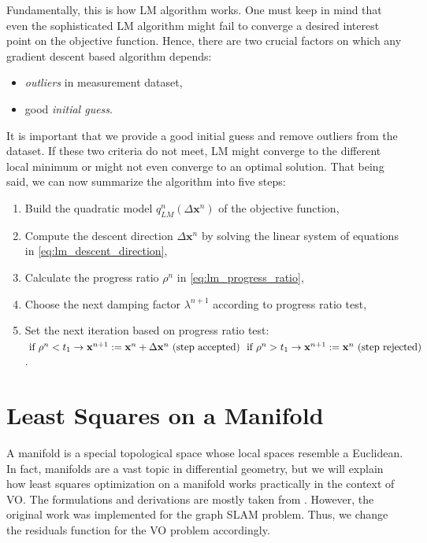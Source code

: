 \documentclass[a4paper]{report}
\numberwithin{figure}{section}
\begin{document}
\begin{appendices}
Fundamentally, this is how LM algorithm works. 
One must keep in mind that even the sophisticated LM algorithm might fail to 
converge a desired interest point on the objective function. Hence, 
there are two crucial factors on which any gradient descent based algorithm depends:
\begin{itemize}
  \item \textit{outliers} in measurement dataset,
  \item good \textit{initial guess}. 
\end{itemize}

It is important that we provide a good initial
guess and remove outliers from the dataset. 
If these two criteria do not meet, LM might converge to the
different local minimum or might not even converge to
an optimal solution. 
That being said, we can now summarize the algorithm into five steps:

\begin{enumerate}
  \item Build the quadratic model $q_{LM}^n(\Delta \mathbf{x}^n)$ of the objective function,
  \item Compute the descent direction $\Delta \mathbf{x}^n$ by solving the linear system of 
    equations in \eqref{eq:lm_descent_direction},
  \item Calculate the progress ratio $\rho^n$ in \eqref{eq:lm_progress_ratio},
  \item Choose the next damping factor $\lambda^{n+1}$ according to progress ratio test,
  \item Set the next iteration based on progress ratio test:
    $\\ \text{  if } \rho^n < t_1 \rightarrow \mathbf{x}^{n+1}:=\mathbf{x}^n +\Delta \mathbf{x}^n \text{ (step accepted) }\\ 
    \text{  if }\rho^n > t_1 \rightarrow \mathbf{x}^{n+1}:=\mathbf{x}^n \text{ (step rejected)}$.
\end{enumerate}



\section{Least Squares on a Manifold}\label{sc_lsq_manifold}

A manifold is a special topological space whose local spaces resemble a 
Euclidean.
In fact, manifolds are a vast topic in differential geometry, but
we will explain how least squares optimization on 
a manifold works practically in the context of VO. The formulations and 
derivations are mostly taken from \parencite{Sol2016}. However, 
the original work was implemented for the graph SLAM problem. Thus, 
we change the residuals function for the VO problem accordingly. 


\end{appendices}
\end{document}
